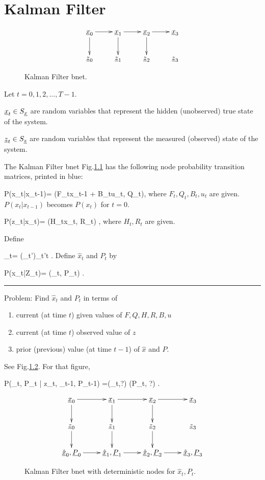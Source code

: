 \chapter{Kalman Filter}

\begin{figure}[h!]
\centering
$$\xymatrix{
\rvx_0\ar[d]\ar[r]&
\rvx_1\ar[d]\ar[r]&
\rvx_2\ar[d]\ar[r]&
\rvx_3\\
\rvz_0&
\rvz_1&
\rvz_2&
\rvz_3
}$$
\caption{Kalman Filter bnet.}
\label{fig-kal}
\end{figure}

Let $t=0, 1, 2, \dots , T-1$.

${\underline{x}}_t\in S_{\underline{x}}$ are
random variables that represent
the hidden (unobserved) true
state of the system.

${\underline{z}}_t\in S_{\underline{z}}$ are 
random variables that represent
the measured (observed) state of the system.


The Kalman Filter bnet Fig.\ref{fig-kal}
has the following
node probability transition matrices,
printed in blue:


\beq\color{blue}
P(x_t|x_{t-1})=
\caln(F_tx_{t-1} + B_tu_t, Q_t)\;,
\eeq
where $F_t, Q_t, B_t, u_t$
are given. $P(x_t|x_{t-1})$ becomes $P(x_t)$
for $t=0$.

\beq\color{blue}
P(z_t|x_t)=
\caln(H_tx_t, R_t)
\;,
\eeq
where $H_t, R_t$ are given.

Define

\beq
\rvZ_t= (\rvz_{t'})_{t'\leq t}
\;.
\eeq
Define $\hat{x}_t$ and $P_t$ by

\beq
P(x_t|Z_t)=
\caln(_t, P_t)
\;.
\eeq
\hrule
\medskip
\noindent
Problem: Find $\hat{x}_t$ and $P_t$
in terms of 
\begin{enumerate}
\item
 current (at time $t$)
 given values of
$F,Q,H,R,
 B ,u$
\item
 current (at time $t$)
observed  value of 
$z$
\item
prior (previous)
value (at time $t-1$) of $\hat{x}$
and $P$.
\end{enumerate}
See Fig.\ref{fig-kal-plus}.
For that figure,

\beq \color{blue}
P(_t, P_t | z_t,
_{t-1}, P_{t-1})
=\delta(_t,?)
\delta(P_t, ?)
\;.
\eeq

\begin{figure}[h!]
\centering
$$\xymatrix{
\rvx_0\ar[d]\ar[r]&
\rvx_1\ar[d]\ar[r]&
\rvx_2\ar[d]\ar[r]&
\rvx_3\\
\rvz_0\ar[d]&
\rvz_1\ar[d]&
\rvz_2\ar[d]&
\rvz_3\\
\ul{\hat{x}}_0, 
\ul{P}_0\ar[r]&
\ul{\hat{x}}_1, 
\ul{P}_1\ar[r]&
\ul{\hat{x}}_2, 
\ul{P}_2\ar[r]&
\ul{\hat{x}}_3, 
\ul{P}_3
}$$
\caption{Kalman Filter bnet
with deterministic nodes for 
$\hat{x}_t, P_t$.}
\label{fig-kal-plus}
\end{figure}

